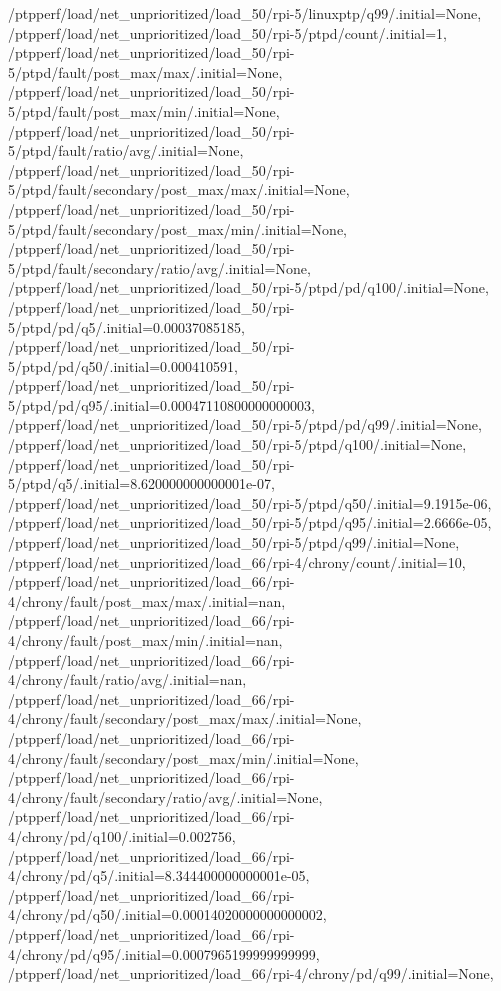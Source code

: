 {    /ptpperf/load/net_unprioritized/load_50/rpi-5/linuxptp/q99/.initial=None,
    /ptpperf/load/net_unprioritized/load_50/rpi-5/ptpd/count/.initial=1,
    /ptpperf/load/net_unprioritized/load_50/rpi-5/ptpd/fault/post_max/max/.initial=None,
    /ptpperf/load/net_unprioritized/load_50/rpi-5/ptpd/fault/post_max/min/.initial=None,
    /ptpperf/load/net_unprioritized/load_50/rpi-5/ptpd/fault/ratio/avg/.initial=None,
    /ptpperf/load/net_unprioritized/load_50/rpi-5/ptpd/fault/secondary/post_max/max/.initial=None,
    /ptpperf/load/net_unprioritized/load_50/rpi-5/ptpd/fault/secondary/post_max/min/.initial=None,
    /ptpperf/load/net_unprioritized/load_50/rpi-5/ptpd/fault/secondary/ratio/avg/.initial=None,
    /ptpperf/load/net_unprioritized/load_50/rpi-5/ptpd/pd/q100/.initial=None,
    /ptpperf/load/net_unprioritized/load_50/rpi-5/ptpd/pd/q5/.initial=0.00037085185,
    /ptpperf/load/net_unprioritized/load_50/rpi-5/ptpd/pd/q50/.initial=0.000410591,
    /ptpperf/load/net_unprioritized/load_50/rpi-5/ptpd/pd/q95/.initial=0.00047110800000000003,
    /ptpperf/load/net_unprioritized/load_50/rpi-5/ptpd/pd/q99/.initial=None,
    /ptpperf/load/net_unprioritized/load_50/rpi-5/ptpd/q100/.initial=None,
    /ptpperf/load/net_unprioritized/load_50/rpi-5/ptpd/q5/.initial=8.620000000000001e-07,
    /ptpperf/load/net_unprioritized/load_50/rpi-5/ptpd/q50/.initial=9.1915e-06,
    /ptpperf/load/net_unprioritized/load_50/rpi-5/ptpd/q95/.initial=2.6666e-05,
    /ptpperf/load/net_unprioritized/load_50/rpi-5/ptpd/q99/.initial=None,
    /ptpperf/load/net_unprioritized/load_66/rpi-4/chrony/count/.initial=10,
    /ptpperf/load/net_unprioritized/load_66/rpi-4/chrony/fault/post_max/max/.initial=nan,
    /ptpperf/load/net_unprioritized/load_66/rpi-4/chrony/fault/post_max/min/.initial=nan,
    /ptpperf/load/net_unprioritized/load_66/rpi-4/chrony/fault/ratio/avg/.initial=nan,
    /ptpperf/load/net_unprioritized/load_66/rpi-4/chrony/fault/secondary/post_max/max/.initial=None,
    /ptpperf/load/net_unprioritized/load_66/rpi-4/chrony/fault/secondary/post_max/min/.initial=None,
    /ptpperf/load/net_unprioritized/load_66/rpi-4/chrony/fault/secondary/ratio/avg/.initial=None,
    /ptpperf/load/net_unprioritized/load_66/rpi-4/chrony/pd/q100/.initial=0.002756,
    /ptpperf/load/net_unprioritized/load_66/rpi-4/chrony/pd/q5/.initial=8.344400000000001e-05,
    /ptpperf/load/net_unprioritized/load_66/rpi-4/chrony/pd/q50/.initial=0.00014020000000000002,
    /ptpperf/load/net_unprioritized/load_66/rpi-4/chrony/pd/q95/.initial=0.0007965199999999999,
    /ptpperf/load/net_unprioritized/load_66/rpi-4/chrony/pd/q99/.initial=None,
}
